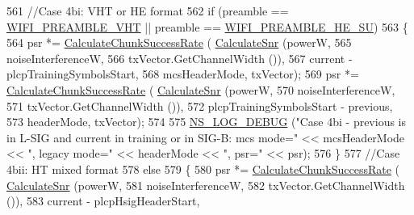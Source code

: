 \begin{DoxyCode}
561               \textcolor{comment}{//Case 4bi: VHT or HE format}
562               \textcolor{keywordflow}{if} (preamble == \hyperlink{group__wifi_gga5e94a56cb338a14ffbbb19c6a41251ebab90b0fe0b17f27e51c0fe16239e7b089}{WIFI\_PREAMBLE\_VHT} || preamble == 
      \hyperlink{group__wifi_gga5e94a56cb338a14ffbbb19c6a41251eba99c3e12c6e91fc9a9bee491d20dab807}{WIFI\_PREAMBLE\_HE\_SU})
563                 \{
564                   psr *= \hyperlink{classns3_1_1InterferenceHelper_ab1c34c3f7ecef1e37ec778c0cf0e9cef}{CalculateChunkSuccessRate} (
      \hyperlink{classns3_1_1InterferenceHelper_a8f6192d041874595004c007c5a519b4b}{CalculateSnr} (powerW,
565                                                                   noiseInterferenceW,
566                                                                   txVector.GetChannelWidth ()),
567                                                     current - plcpTrainingSymbolsStart,
568                                                     mcsHeaderMode, txVector);
569                   psr *= \hyperlink{classns3_1_1InterferenceHelper_ab1c34c3f7ecef1e37ec778c0cf0e9cef}{CalculateChunkSuccessRate} (
      \hyperlink{classns3_1_1InterferenceHelper_a8f6192d041874595004c007c5a519b4b}{CalculateSnr} (powerW,
570                                                                   noiseInterferenceW,
571                                                                   txVector.GetChannelWidth ()),
572                                                     plcpTrainingSymbolsStart - previous,
573                                                     headerMode, txVector);
574 
575                   \hyperlink{group__logging_ga413f1886406d49f59a6a0a89b77b4d0a}{NS\_LOG\_DEBUG} (\textcolor{stringliteral}{"Case 4bi - previous is in L-SIG and current in training or in
       SIG-B: mcs mode="} << mcsHeaderMode << \textcolor{stringliteral}{", legacy mode="} << headerMode << \textcolor{stringliteral}{", psr="} << psr);
576                 \}
577               \textcolor{comment}{//Case 4bii: HT mixed format}
578               \textcolor{keywordflow}{else}
579                 \{
580                   psr *= \hyperlink{classns3_1_1InterferenceHelper_ab1c34c3f7ecef1e37ec778c0cf0e9cef}{CalculateChunkSuccessRate} (
      \hyperlink{classns3_1_1InterferenceHelper_a8f6192d041874595004c007c5a519b4b}{CalculateSnr} (powerW,
581                                                                   noiseInterferenceW,
582                                                                   txVector.GetChannelWidth ()),
583                                                     current - plcpHsigHeaderStart,

\end{DoxyCode}
